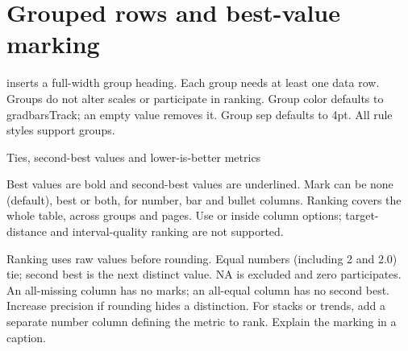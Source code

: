 \section{Grouped rows and best-value marking}
 inserts a full-width group heading. Each group needs at
least one data row. Groups do not alter scales or participate in ranking.
Group color defaults to gradbarsTrack; an empty value removes it. Group sep
defaults to 4pt. All rule styles support groups.
\begin{demo}{Ties, second-best values and lower-is-better metrics}
\begin{center}
\begin{gradtable}[align=c,header align=c,text width=30mm,
  graphic width=38mm,label width=12mm,group sep=4pt]
\end{gradtable}
\end{center}
\end{demo}
Best values are bold and second-best values are underlined. Mark can be none
(default), best or both, for number, bar and bullet columns. Ranking covers the
whole table, across groups and pages. Use  or  inside
column options; target-distance and interval-quality ranking are not supported.

Ranking uses raw values before rounding. Equal numbers (including 2 and 2.0)
tie; second best is the next distinct value. NA is excluded and zero participates.
An all-missing column has no marks; an all-equal column has no second best.
Increase precision if rounding hides a distinction. For stacks or trends, add a
separate number column defining the metric to rank. Explain the marking in a caption.

\clearpage


